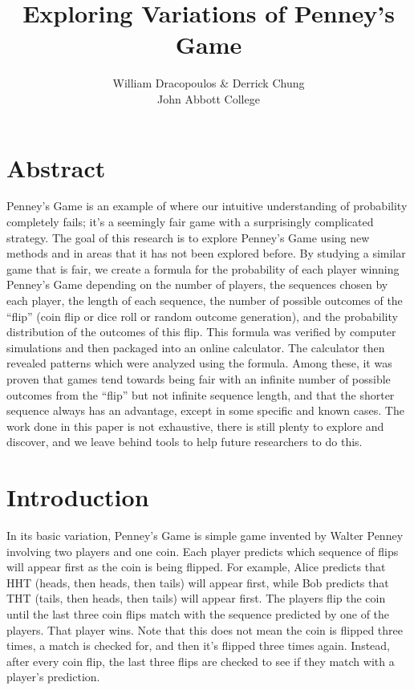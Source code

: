 \documentclass[english,12pt,a4paper,final]{article}
\title{Exploring Variations of Penney's Game}
\author{
William Dracopoulos \& Derrick Chung
\\
John Abbott College
}
\begin{document}
	
\maketitle
\newpage

\tableofcontents
\newpage

\part{Abstract}

Penney’s Game is an example of where our intuitive understanding of probability completely fails; it’s a seemingly fair game with a surprisingly complicated strategy. The goal of this research is to explore Penney’s Game using new methods and in areas that it has not been explored before. By studying a similar game that is fair, we create a formula for the probability of each player winning Penney’s Game depending on the number of players, the sequences chosen by each player, the length of each sequence, the number of possible outcomes of the “flip” (coin flip or dice roll or random outcome generation), and the probability distribution of the outcomes of this flip. This formula was verified by computer simulations and then packaged into an online calculator. The calculator then revealed patterns which were analyzed using the formula. Among these, it was proven that games tend towards being fair with an infinite number of possible outcomes from the “flip” but not infinite sequence length, and that the shorter sequence always has an advantage, except in some specific and known cases. The work done in this paper is not exhaustive, there is still plenty to explore and discover, and we leave behind tools to help future researchers to do this.

\part{Introduction}

In its basic variation, Penney's Game is simple game invented by Walter Penney involving two players and one coin. Each player predicts which sequence of flips will appear first as the coin is being flipped. For example, Alice predicts that HHT (heads, then heads, then tails) will appear first, while Bob predicts that THT (tails, then heads, then tails) will appear first. The players flip the coin until the last three coin flips match with the sequence predicted by one of the players. That player wins. Note that this does not mean the coin is flipped three times, a match is checked for, and then it's flipped three times again. Instead, after every coin flip, the last three flips are checked to see if they match with a player's prediction.
\end{document}
